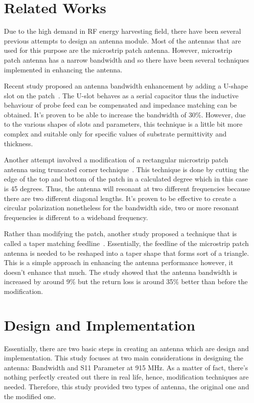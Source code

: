 \documentclass[conference]{IEEEtran}
\begin{document}
\section{Related Works}
Due to the high demand in RF energy harvesting field, there have been several previous attempts to design an antenna module. Most of the antennas that are used for this purpose are the microstrip patch antenna. However, microstrip patch antenna has a narrow bandwidth and so there have been several techniques implemented in enhancing the antenna.  

Recent study proposed an antenna bandwidth enhancement by adding a U-shape slot on the patch~\cite{surmeli2011u}. The U-slot behaves as a serial capacitor thus the inductive behaviour of probe feed can be compensated and impedance matching can be obtained. It's proven to be able to increase the bandwidth of 30\%. However, due to the various shapes of slots and parameters, this technique is a little bit more complex and suitable only for specific values of substrate permittivity and thickness.

Another attempt involved a modification of a rectangular microstrip patch antenna using truncated corner technique~\cite{armin2020modification}. This technique is done by cutting the edge of the top and bottom of the patch in a calculated degree which in this case is 45 degrees. Thus, the antenna will resonant at two different frequencies because there are two different diagonal lengths. It's proven to be effective to create a circular polarization nonetheless for the bandwidth side, two or more resonant frequencies is different to a wideband frequency. 

Rather than modifying the patch, another study proposed a technique that is called a taper matching feedline~\cite{rabbani2014simple}. Essentially, the feedline of the microstrip patch antenna is needed to be reshaped into a taper shape that forms sort of a triangle. This is a simple approach in enhancing the antenna performance however, it doesn't enhance that much. The study showed that the antenna bandwidth is increased by around 9\% but the return loss is around 35\% better than before the modification.

\section{Design and Implementation}
Essentially, there are two basic steps in creating an antenna which are design and implementation. This study focuses at two main considerations in designing the antenna: Bandwidth and S11 Parameter at 915 MHz. As a matter of fact, there's nothing perfectly created out there in real life, hence, modification techniques are needed. Therefore, this study provided two types of antenna, the original one and the modified one.
\end{document}
